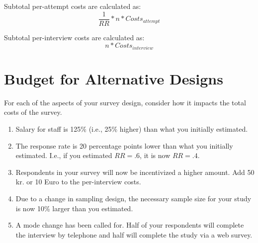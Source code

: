 \documentclass[12pt, a4]{article}
\begin{document}
\vspace{1em}
Subtotal per-attempt costs are calculated as:
\begin{equation}
\frac{1}{RR} * n * Costs_{attempt}
\end{equation}

Subtotal per-interview costs are calculated as:
\begin{equation}
n * Costs_{interview}
\end{equation}


\section{Budget for Alternative Designs}

\noindent For each of the aspects of your survey design, consider how it impacts the total costs of the survey.

\begin{enumerate}\itemsep2em
\item Salary for staff is 125\% (i.e., 25\% higher) than what you initially estimated.
\item The response rate is 20 percentage points lower than what you initially estimated. I.e., if you estimated $RR = .6$, it is now $RR = .4$.
\item Respondents in your survey will now be incentivized a higher amount. Add 50 kr. or 10 Euro to the per-interview costs.
\item Due to a change in sampling design, the necessary sample size for your study is now 10\% larger than you estimated.
\item A mode change has been called for. Half of your respondents will complete the interview by telephone and half will complete the study via a web survey.
\end{enumerate}
\end{document}

